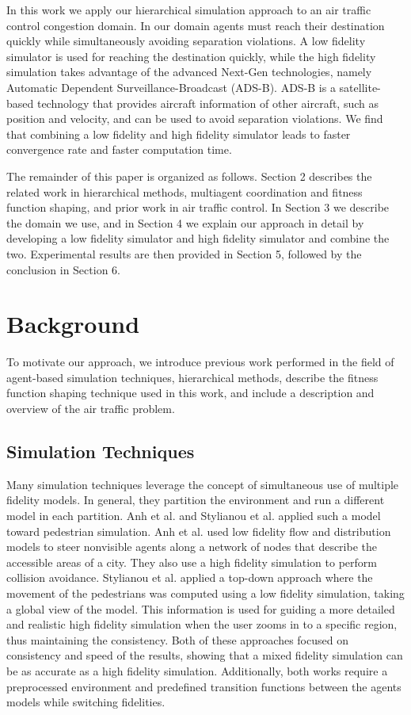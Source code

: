 \documentclass{aamas2014}
\begin{document}
In this work we apply our hierarchical simulation approach to an air traffic control congestion domain. In our domain agents must reach their destination quickly while simultaneously avoiding separation violations. A low fidelity simulator is used for reaching the destination quickly, while the high fidelity simulation takes advantage of the advanced Next-Gen \cite{next-gen} technologies, namely Automatic Dependent Surveillance-Broadcast (ADS-B). ADS-B is a satellite-based technology that provides aircraft information of other aircraft, such as position and velocity, and can be used to avoid separation violations. We find that combining a low fidelity and high fidelity simulator leads to faster convergence rate and faster computation time.

The remainder of this paper is organized as follows. Section 2 describes the related work in hierarchical methods, multiagent coordination and fitness function shaping, and prior work in air traffic control. In Section 3 we describe the domain we use, and in Section 4 we explain our approach in detail by developing a low fidelity simulator and high fidelity simulator and combine the two. Experimental results are then provided in Section 5, followed by the conclusion in Section 6.

\section{Background}

To motivate our approach, we introduce previous work performed in the field of agent-based simulation techniques, hierarchical methods, describe the fitness function shaping technique used in this work, and include a description and overview of the air traffic problem.

\subsection{Simulation Techniques}

Many simulation techniques leverage the concept of simultaneous use of multiple fidelity models. In general, they partition the environment and run a different model in each partition. Anh et al. \cite{Anh:2011:HMP:2183423.2183461} and Stylianou et al. \cite{Stylianou04scalablepedestrian} applied such a model toward pedestrian simulation. Anh et al. used low fidelity flow and distribution models to steer nonvisible agents along a network of nodes that describe the accessible areas of a city. They also use a high fidelity simulation to perform collision avoidance. Stylianou et al. applied a top-down approach where the movement of the pedestrians was computed using a low fidelity simulation, taking a global view of the model. This information is used for guiding a more detailed and realistic high fidelity simulation when the user zooms in to a specific region, thus maintaining the consistency. Both of these approaches focused on consistency and speed of the results, showing that a mixed fidelity simulation can be as accurate as a high fidelity simulation. Additionally, both works require a preprocessed environment and predefined transition functions between the agents models while switching fidelities.
\end{document}
